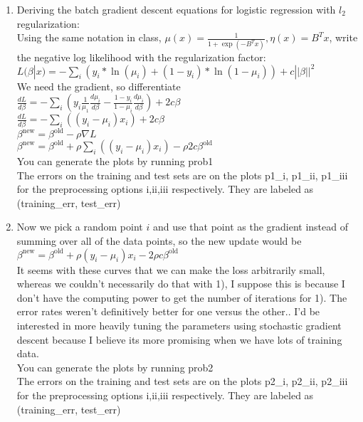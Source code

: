 \documentclass[11pt]{article}
\begin{document}
\begin{enumerate}
\item
Deriving the batch gradient descent equations for logistic regression with $l_2$ regularization:\\
Using the same notation in class, $\mu(x) = \frac{1}{1+ \exp(-B^T x)}, \eta(x) = B^Tx$,
write the negative log likelihood with the regularization factor:\\
$L(\beta|x) = -\sum\limits_i(y_i*\ln(\mu_i) + (1-y_i)*\ln(1-\mu_i)) + c||\beta||^2 $\\
We need the gradient, so differentiate\\
$\frac{dL}{d\beta} = -\sum\limits_i\left (y_i\frac{1}{\mu_1}\frac{d\mu_i}{d\beta} - \frac{1-y_i}{1-\mu_i} \frac{d\mu_i}{d\beta}\right)+2c\beta$\\
$\frac{dL}{d\beta} = -\sum\limits_i\left ((y_i-\mu_i)x_i\right)+2c\beta$\\
$\beta^{\text{new}} = \beta^{\text{old}} - \rho \nabla L$\\
$\beta^{\text{new}} = \beta^{\text{old}} + \rho\sum\limits_i\left ((y_i-\mu_i)x_i\right)-\rho 2c\beta^{\text{old}}$\\

You can generate the plots by running prob1\\
The errors on the training and test sets are on the plots p1\_i, p1\_ii, p1\_iii for the preprocessing options i,ii,iii respectively. They are labeled as (training\_err, test\_err)
\item
Now we pick a random point $i$ and use that point as the gradient instead of summing over all of the data points, so the new update would be \\
$\beta^\text{new}=\beta^{\text{old}}+\rho (y_i-\mu_i)x_i - 2\rho c\beta^{\text{old}}$\\
It seems with these curves that we can make the loss arbitrarily small, whereas we couldn't necessarily do that with 1), I suppose this is because I don't have the computing power to get the number of iterations for 1). The error rates weren't definitively better for one versus the other.. I'd be interested in more heavily tuning the parameters using stochastic gradient descent because I believe its more promising when we have lots of training data.\\

You can generate the plots by running prob2\\
The errors on the training and test sets are on the plots p2\_i, p2\_ii, p2\_iii for the preprocessing options i,ii,iii respectively. They are labeled as (training\_err, test\_err)


\end{enumerate}
\end{document}

